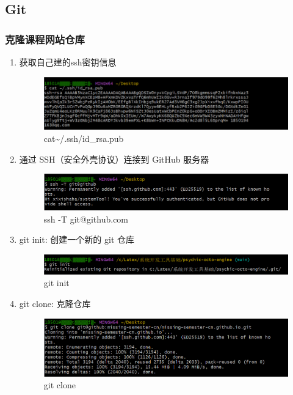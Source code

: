 \documentclass{ctexart}
\begin{document}
\subsection{Git}
\vspace{5pt}\subsubsection{克隆课程网站仓库}
\vspace{5pt}\begin{enumerate}
    \item 获取自己建的ssh密钥信息
\begin{figure}[H]
    \centering
    \includegraphics[width=16cm]{111.png}
    \caption{cat\quad\textasciitilde{}/.ssh/id\_rsa.pub}
    \label{fig:11}
\end{figure}
    \item 通过 SSH（安全外壳协议）连接到 GitHub 服务器
     \begin{figure}[H]
        \centering
        \includegraphics[width=18cm]{3.png}
        \caption{ssh -T git@github.com}
        \label{fig:12}
    \end{figure}
\vspace{-5pt}\item git init: 创建一个新的 git 仓库
    \begin{figure}[H]
    \centering
    \includegraphics[width=18cm]{6480defad74ba047289d64330675609b.png}
    \caption{git init}
    \label{fig:112}
\end{figure}

    \item git clone: 克隆仓库
    \begin{figure}[H]
       \centering
       \includegraphics[width=16cm]{4.png}
       \caption{git clone}
       \label{fig:13}
   \end{figure}


\end{enumerate}
\end{document}
